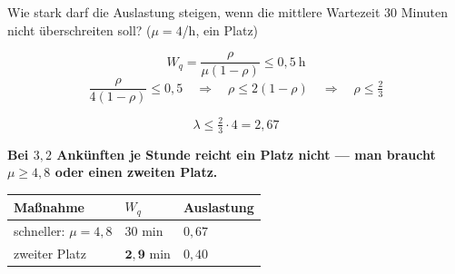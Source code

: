 \begin{aufgabe}
Wie stark darf die Auslastung steigen, wenn die mittlere Wartezeit $30$ Minuten nicht überschreiten soll? ($\mu = 4$/h, ein Platz)

\loesung
{}
\[ W_q = \frac{\rho}{\mu(1-\rho)} \le 0{,}5 \ \text{h} \]
\[ \frac{\rho}{4(1-\rho)} \le 0{,}5 \quad\Longrightarrow\quad \rho \le 2(1-\rho) \quad\Longrightarrow\quad \rho \le \tfrac23 \]

\[ \lambda \le \tfrac23\cdot4 = 2{,}67 \]

\begin{center}
\begin{minipage}{0.9\textwidth}
\textbf{Bei $3{,}2$ Ankünften je Stunde reicht ein Platz nicht --- man braucht $\mu \ge 4{,}8$ oder einen zweiten Platz.}
\end{minipage}
\end{center}

\begin{center}
{\small
\renewcommand{\arraystretch}{1.48}
\begin{tabular}{@{}P{3.0cm}P{2.2cm}P{2.4cm}@{}}
\toprule
\textbf{Maßnahme} & $W_q$ & \textbf{Auslastung}\\
\midrule
schneller: $\mu = 4{,}8$ & $30$ min & $0{,}67$\\
zweiter Platz & $\mathbf{2{,}9}$ min & $0{,}40$\\
\bottomrule
\end{tabular}}
\end{center}

\begin{center}
\begin{minipage}{0.88\textwidth}
\end{minipage}
\end{center}
\end{aufgabe}

